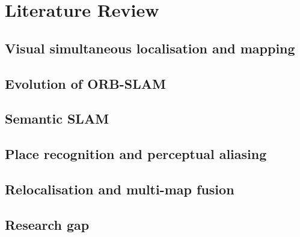 \chapter{Literature Review}
\label{chap:literature-review}

\section{Visual simultaneous localisation and mapping}

\section{Evolution of ORB-SLAM}

\section{Semantic SLAM}

\section{Place recognition and perceptual aliasing}

\section{Relocalisation and multi-map fusion}

\section{Research gap}
